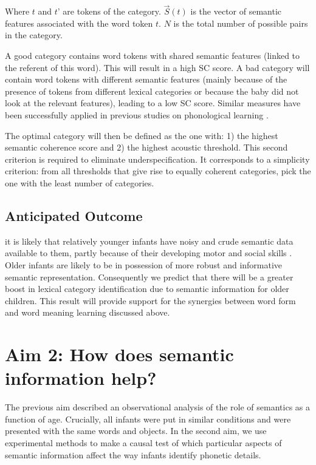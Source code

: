 \documentclass[12pt]{article}
\begin{document}
Where $t$ and $t’$ are tokens of the category.  $\vec{S}(t)$ is the vector of semantic features associated with the word token $t$. $N$ is the total number of possible pairs in the category.

A good category contains word tokens with shared semantic features (linked to the referent of this word). This will result in a high SC score.   A bad category will contain word tokens with different semantic features (mainly because of the presence of tokens from different lexical categories or because the baby did not look at the relevant features), leading to a low SC score. Similar measures have been successfully applied in previous studies on phonological learning \cite{fourtassi2014a, fourtassi2014b}.

The optimal category will then be defined as the one with: 1) the highest semantic coherence score and 2) the highest acoustic threshold. This second criterion is required to eliminate underspecification. It corresponds to a simplicity criterion: from all thresholds that give rise to equally coherent categories, pick the one with the least number of categories.

\subsection{Anticipated Outcome}

it is likely that relatively younger infants have noisy and crude semantic data available to them, partly because of their developing motor and social skills \cite{frank2013}.  Older infants are likely to be in possession of more robust and informative semantic representation. Consequently we predict that there will be a greater boost in lexical category identification due to semantic information for older children. This result will provide support for the synergies between word form and word meaning learning discussed above.  

\section{Aim 2: How does semantic information help?}

The previous aim described an observational analysis of the role of semantics as a function of age. Crucially, all infants were put in similar conditions and were presented with the same words and objects. In the second aim, we use experimental methods to make a causal test of which particular aspects of semantic information affect the way infants identify phonetic details.
\end{document}
